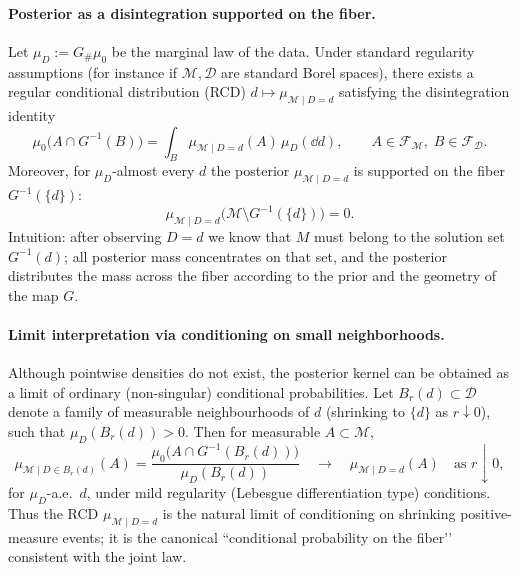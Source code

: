 \documentclass[11pt]{article}
\theoremstyle{remark}
\newcommand{\modelspace}{\mathcal{M}}
\newcommand{\dataspace}{\mathcal{D}}
\begin{document}
\paragraph{Posterior as a disintegration supported on the fiber.}
Let \(\mu_{D}:=G_\#\mu_0\) be the marginal law of the data.  Under standard
regularity assumptions (for instance if \(\modelspace,\dataspace\) are standard
Borel spaces), there exists a regular conditional distribution (RCD)
\(d\mapsto \mu_{\modelspace\mid D=d}\) satisfying the disintegration identity
\[
\mu_0\!\bigl(A\cap G^{-1}(B)\bigr)
=
\int_B \mu_{\modelspace\mid D=d}(A)\,\mu_{D}(\dd d),
\qquad A\in\mathcal{F}_{\modelspace},\; B\in\mathcal{F}_{\dataspace}.
\]
Moreover, for \(\mu_D\)-almost every \(d\) the posterior \(\mu_{\modelspace\mid D=d}\)
is supported on the fiber \(G^{-1}(\{d\})\):
\[
\mu_{\modelspace\mid D=d}\!\bigl(\modelspace\setminus G^{-1}(\{d\})\bigr)=0.
\]
Intuition: after observing \(D=d\) we know that \(M\) must belong to
the solution set \(G^{-1}(d)\); all posterior mass concentrates on that set,
and the posterior distributes the mass across the fiber according to the prior
and the geometry of the map \(G\).

\paragraph{Limit interpretation via conditioning on small neighborhoods.}
Although pointwise densities do not exist, the posterior kernel can be obtained
as a limit of ordinary (non-singular) conditional probabilities.  Let
\(B_r(d)\subset\dataspace\) denote a family of measurable neighbourhoods of \(d\)
(shrinking to \(\{d\}\) as \(r\downarrow 0\)), such that \(\mu_D(B_r(d))>0\).
Then for measurable \(A\subset\modelspace\),
\[
\mu_{\modelspace\mid D\in B_r(d)}(A)
=
\frac{\mu_0\!\bigl(A\cap G^{-1}(B_r(d))\bigr)}{\mu_{D}(B_r(d))}
\quad\longrightarrow\quad
\mu_{\modelspace\mid D=d}(A)
\quad\text{as }r\downarrow 0,
\]
for \(\mu_D\)-a.e.\ \(d\), under mild regularity (Lebesgue differentiation
type) conditions. Thus the RCD \(\mu_{\modelspace\mid D=d}\) is the natural
limit of conditioning on shrinking positive-measure events; it is the canonical
“conditional probability on the fiber’’ consistent with the joint law.
\end{document}
